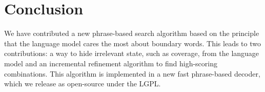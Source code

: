 \documentclass[11pt]{article}
\begin{document}
\section{Conclusion}
We have contributed a new phrase-based search algorithm based on the principle that the language model cares the most about boundary words.  This leads to two contributions: a way to hide irrelevant state, such as coverage, from the language model and an incremental refinement algorithm to find high-scoring combinations.  This algorithm is implemented in a new fast phrase-based decoder, which we release as open-source under the LGPL.  




\end{document}
